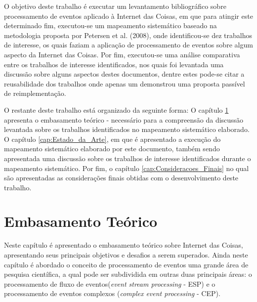 \documentclass[ti,table]{texufpel} %
\begin{document}
  

O objetivo deste trabalho é executar um levantamento bibliográfico sobre processamento de eventos aplicado à Internet das Coisas, em que para atingir este determinado fim, executou-se um mapeamento sistemático baseado na metodologia proposta por Petersen et al. (2008), onde identificou-se dez trabalhos de interesse, os quais faziam a aplicação de processamento de eventos sobre algum aspecto da Internet das Coisas. Por fim, executou-se uma análise comparativa entre os trabalhos de interesse identificados, nos quais foi levantada uma discussão sobre alguns aspectos destes documentos, dentre estes pode-se citar a reusabilidade dos trabalhos onde apenas um demonstrou uma proposta passível de reimplementação.  

  

  

O restante deste trabalho está organizado da seguinte forma: O capítulo \ref{cap:Embasamento_Teorico} apresenta o embasamento teórico - necessário para a compreensão da discussão levantada sobre os trabalhos identificados no mapeamento sistemático elaborado. O capítulo \ref{cap:Estado_da_Arte}, em que é apresentado a execução do mapeamento sistemático elaborado por este documento, também sendo apresentada uma discussão sobre os trabalhos de interesse identificados durante o mapeamento sistemático. Por fim, o capítulo \ref{cap:Consideracoes_Finais} no qual são apresentadas as considerações finais obtidas com o desenvolvimento deste trabalho. 

  

  

  

  

\chapter{Embasamento Teórico} 

\label{cap:Embasamento_Teorico} 

  

Neste capítulo é apresentado o embasamento teórico sobre Internet das Coisas, apresentando seus principais objetivos e desafios a serem superados. Ainda neste capítulo é abordado o conceito de processamento de eventos uma grande área de pesquisa científica, a qual pode ser subdividida em outras duas principais áreas: o processamento de fluxo de eventos(\textit{event stream processing} - ESP) e o processamento de eventos complexos (\textit{complex event processing} - CEP).  
\end{document}

